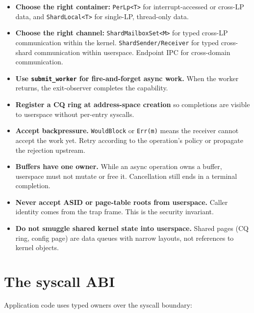 \begin{itemize}
    \item \textbf{Choose the right container:} \texttt{PerLp<T>} for
        interrupt-accessed or cross-LP data, and \texttt{ShardLocal<T>} for
        single-LP, thread-only data.
    \item \textbf{Choose the right channel:} \texttt{ShardMailboxSet<M>} for typed
        cross-LP communication within the kernel. \texttt{ShardSender/Receiver}
        for typed cross-shard communication within userspace. Endpoint IPC
        for cross-domain communication.
    \item \textbf{Use \texttt{submit\_worker} for fire-and-forget async work.}
        When the worker returns, the exit-observer completes the capability.
    \item \textbf{Register a CQ ring at address-space creation} so completions
        are visible to userspace without per-entry syscalls.
    \item \textbf{Accept backpressure.} \texttt{WouldBlock} or \texttt{Err(m)}
        means the receiver cannot accept the work yet. Retry according to the
        operation's policy or propagate the rejection upstream.
    \item \textbf{Buffers have one owner.} While an async operation owns a
        buffer, userspace must not mutate or free it. Cancellation still ends
        in a terminal completion.
    \item \textbf{Never accept ASID or page-table roots from userspace.} Caller
        identity comes from the trap frame. This is the security invariant.
    \item \textbf{Do not smuggle shared kernel state into userspace.} Shared
        pages (CQ ring, config page) are data queues with narrow layouts, not
        references to kernel objects.
\end{itemize}

\section{The syscall ABI}

Application code uses typed owners over the syscall boundary:

